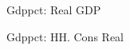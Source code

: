 \documentclass{article}
\begin{document}
 
\begin{figure}[htbp]
\centering
\resizebox{\textwidth}{!}{}
\caption{Gdppct: Real GDP}
\end{figure}

 
\begin{figure}[htbp]
\centering
\resizebox{\textwidth}{!}{}
\caption{Gdppct: HH. Cons Real}
\end{figure}
\end{document}
